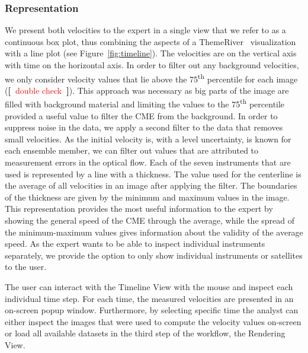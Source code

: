 \documentclass[journal]{vgtc}                %
\newcommand{\todo}[1] {\textbf{[~}\textcolor {red}{#1}\marginpar{\textcolor {red}{\centerline{{\Huge \textbf{!}}}}}\textbf{~]}}
\newcommand{\todo}[1] {\textbf{[~}\textcolor {red}{#1}\marginpar{\textcolor {red}{\centerline{{\Huge \textbf{!}}}}}\textbf{~]}}
\begin{document}

\subsubsection{Representation} \label{sec:representation}
We present both velocities to the expert in a single view that we refer to as a continuous box plot, thus combining the aspects of a ThemeRiver~\cite{havre2002themeriver} visualization with a line plot (see Figure~\ref{fig:timeline}). The velocities are on the vertical axis with time on the horizontal axis. In order to filter out any background velocities, we only consider velocity values that lie above the 75\textsuperscript{th} percentile for each image (\todo{double check}). This approach was necessary as big parts of the image are filled with background material and limiting the values to the 75\textsuperscript{th} percentile provided a useful value to filter the CME from the background. In order to suppress noise in the data, we apply a second filter to the data that removes small velocities. As the initial velocity is, with a level uncertainty, is known for each ensemble member, we can filter out values that are attributed to measurement errors in the optical flow. Each of the seven instruments that are used is represented by a line with a thickness. The value used for the centerline is the average of all velocities in an image after applying the filter. The boundaries of the thickness are given by the minimum and maximum values in the image. This representation provides the most useful information to the expert by showing the general speed of the CME through the average, while the spread of the minimum-maximum values gives information about the validity of the average speed. As the expert wants to be able to inspect individual instruments separately, we provide the option to only show individual instruments or satellites to the user.

The user can interact with the Timeline View with the mouse and inspect each individual time step. For each time, the measured velocities are presented in an on-screen popup window. Furthermore, by selecting specific time the analyst can either inspect the images that were used to compute the velocity values on-screen or load all available datasets in the third step of the workflow, the Rendering View.
\end{document}
